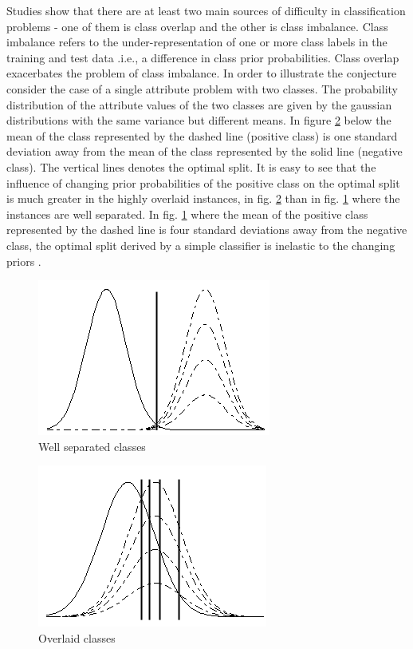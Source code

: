 Studies show that there are at least two main sources of difficulty in classification problems - one of them is class overlap and the other is class imbalance. Class imbalance refers to the under-representation of one or more class labels in the training and test data .i.e., a difference in class prior probabilities. Class overlap exacerbates the problem of class imbalance. In order to illustrate the conjecture consider the case of a single attribute problem with two classes. The probability distribution of the attribute values of the two classes are given by the gaussian distributions with the same variance but different means. In figure \ref{more} below the mean of the class represented by the dashed line (positive class) is one standard deviation away from the mean of the class represented by the solid line (negative class). The vertical lines denotes the optimal split. It is easy to see that the influence of changing prior probabilities of the positive class on the optimal split is much greater in the highly overlaid instances, in fig. \ref{more} than in fig. \ref{less} where the instances are well separated. In fig. \ref{less} where the mean of the positive class represented by the dashed line is four standard deviations away from the negative class, the optimal split derived by a simple classifier is inelastic to the changing priors \cite{overlap}.

\begin{figure}[H]
\centering
\includegraphics[scale=0.5]{images/loverlap}
\caption{Well separated classes}
\label{less}
\end{figure}

\begin{figure}[H]
\centering
\includegraphics[scale=0.5]{images/hoverlap}
\caption{Overlaid classes}
\label{more}
\end{figure}

